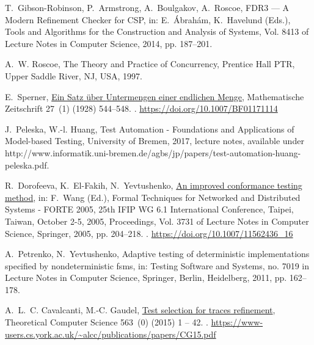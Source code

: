 \documentclass[3p,times]{elsarticle}
\begin{document}
\begin{thebibliography}{10}
T.~Gibson-Robinson, P.~Armstrong, A.~Boulgakov, A.~Roscoe, {FDR3 --- A Modern
  Refinement Checker for CSP}, in: E.~Ábrahám, K.~Havelund (Eds.), Tools and
  Algorithms for the Construction and Analysis of Systems, Vol. 8413 of Lecture
  Notes in Computer Science, 2014, pp. 187--201.

A.~W. Roscoe, The Theory and Practice of Concurrency, Prentice Hall PTR, Upper
  Saddle River, NJ, USA, 1997.

E.~Sperner, \href{https://doi.org/10.1007/BF01171114}{Ein {Satz} {\"u}ber
  {Untermengen} einer endlichen {Menge}}, Mathematische Zeitschrift 27~(1)
  (1928) 544--548.
\newblock \href {http://dx.doi.org/10.1007/BF01171114}
  {}.
\newline\urlprefix\url{https://doi.org/10.1007/BF01171114}

J.~Peleska, W.-l. Huang, Test Automation - Foundations and Applications of
  Model-based Testing, University of Bremen, 2017, lecture notes, available
  under
  http://www.informatik.uni-bremen.de/agbs/jp/papers/test-automation-huang-peleska.pdf.

R.~Dorofeeva, K.~El{-}Fakih, N.~Yevtushenko,
  \href{https://doi.org/10.1007/11562436_16}{An improved conformance testing
  method}, in: F.~Wang (Ed.), Formal Techniques for Networked and Distributed
  Systems - {FORTE} 2005, 25th {IFIP} {WG} 6.1 International Conference,
  Taipei, Taiwan, October 2-5, 2005, Proceedings, Vol. 3731 of Lecture Notes in
  Computer Science, Springer, 2005, pp. 204--218.
\newblock \href {http://dx.doi.org/10.1007/11562436_16}
  {}.
\newline\urlprefix\url{https://doi.org/10.1007/11562436_16}

A.~Petrenko, N.~Yevtushenko, Adaptive testing of deterministic implementations
  specified by nondeterministic fsms, in: Testing Software and Systems, no.
  7019 in Lecture Notes in Computer Science, Springer, Berlin, Heidelberg,
  2011, pp. 162--178.

A.~L.~C. Cavalcanti, M.-C. Gaudel,
  \href{https://www-users.cs.york.ac.uk/~alcc/publications/papers/CG15.pdf}{Test
  selection for traces refinement}, Theoretical Computer Science 563~(0) (2015)
  1 -- 42.
\newblock \href {http://dx.doi.org/10.1016/j.tcs.2014.08.012}
  {}.
\newline\urlprefix\url{https://www-users.cs.york.ac.uk/~alcc/publications/papers/CG15.pdf}

\end{thebibliography}

\end{document}
